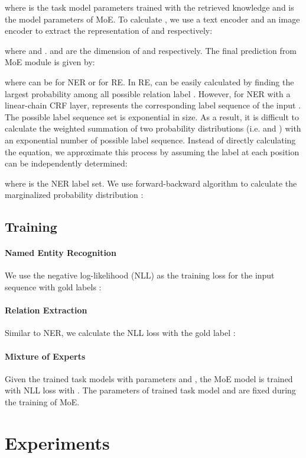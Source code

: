\documentclass[11pt]{article}
\begin{document}
where  is the task model parameters trained with the retrieved knowledge  and  is the model parameters of MoE. To calculate , we use a text encoder and an image encoder to extract the representation of  and  respectively:

where  and .  and  are the dimension of  and  respectively. The final prediction from MoE module is given by:

where  can be  for NER or  for RE. 
In RE,  can be easily calculated by finding the largest probability among all possible relation label . However, for NER with a linear-chain CRF layer,  represents the corresponding label sequence of the input . The possible label sequence set  is exponential in size. As a result, it is difficult to calculate the weighted summation of two probability distributions (i.e.  and ) with an exponential number of possible label sequence. Instead of directly calculating the equation, we approximate this process by assuming the label at each position can be independently determined:

where  is the NER label set. We use forward-backward algorithm to calculate the marginalized probability distribution :







\subsection{Training}
\paragraph{Named Entity Recognition} We use the negative log-likelihood (NLL) as the training loss for the input sequence with gold labels :


\paragraph{Relation Extraction} Similar to NER, we calculate the NLL loss with the gold label :


\paragraph{Mixture of Experts} Given the trained task models with parameters  and , the MoE model is trained with NLL loss with . The parameters of trained task model  and  are fixed during the training of MoE.

\section{Experiments}
\end{document}
